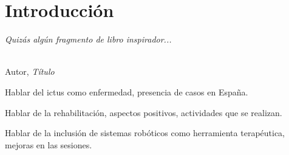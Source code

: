 \chapter{Introducción}
\label{cap:capitulo1}
\setcounter{page}{1}

\begin{flushright}
\begin{minipage}[]{10cm}
\emph{Quizás algún fragmento de libro inspirador...}\\
\end{minipage}\\

Autor, \textit{Título}\\
\end{flushright}

\vspace{1cm}

Hablar del ictus como enfermedad, presencia de casos en España.

Hablar de la rehabilitación, aspectos positivos, actividades que se realizan.

Hablar de la inclusión de sistemas robóticos como herramienta terapéutica, mejoras en las sesiones.
